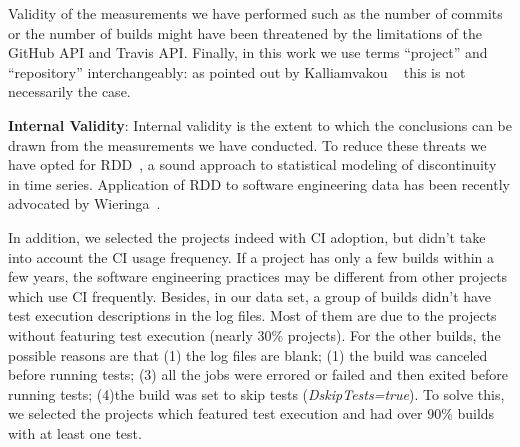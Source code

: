 Validity of the measurements we have performed such as the number of commits or the number of builds might have been threatened by the limitations of the GitHub API and Travis API.
Finally, in this work we use terms ``project'' and ``repository'' interchangeably: as pointed out by Kalliamvakou \etal~\cite{Kalliamvakou2014Promises} this is not necessarily the case. 


\textbf{Internal Validity}:
Internal validity is the extent to which the conclusions can be drawn from the measurements we have conducted. 
To reduce these threats we have opted for RDD~\cite{imbens2008regression}, a sound approach to statistical modeling of discontinuity in time series. 
Application of RDD to software engineering data has been recently advocated by Wieringa~\cite{Wieringa}.

 
In addition, we selected the projects indeed with CI adoption, but didn't take into account the CI usage frequency. If a project has only a few builds within a few years, the software engineering practices may be different from other projects which use CI frequently. 
Besides, in our data set, a group of builds didn't have test execution descriptions in the log files. Most of them are due to the projects without featuring test execution (nearly 30\% projects). For the other builds, the possible reasons are that (1) the log files are blank; (1) the build was canceled before running tests; (3) all the jobs were errored or failed and then exited before running tests; (4)the build was set to skip tests (\eg \textit{DskipTests=true}). To solve this, we selected the projects which featured test execution and had over 90\% builds with at least one test.


